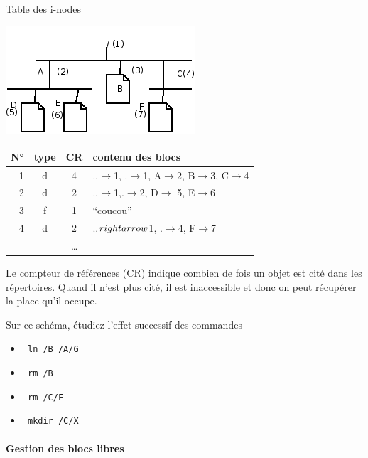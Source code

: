 \begin{multicols}{2}

Table des i-nodes

    \includegraphics[width=0.6\linewidth]{memoire-images/fichiers-unix.png}

\begin{tabular}{|rcc|l|}
\hline
N° & type & CR & contenu des blocs \\
\hline
1 & d & 4 & ..$\rightarrow$1, .$\rightarrow$1, A$\rightarrow$2, B$\rightarrow$3, C$\rightarrow$4 \\
2 & d & 2 & ..$\rightarrow$1,.$\rightarrow$2, D$\rightarrow$ 5, E$\rightarrow$6 \\
3 & f & 1 & ``coucou'' \\
4 & d & 2 & ..$\*rightarrow$1, .$\rightarrow$4, F$\rightarrow$7 \\
& & \ldots & \\
\hline
\end{tabular}

Le compteur de références (CR) indique combien de fois un objet est
cité dans les répertoires. Quand il n'est plus cité, il est inaccessible
et donc on peut récupérer la place qu'il occupe.

\begin{exercice}
Sur ce schéma, étudiez l'effet successif des commandes
\begin{itemize}

\item \texttt{ ln /B /A/G}
\item \texttt{ rm /B }
\item \texttt{ rm /C/F}
\item \texttt{ mkdir /C/X }
\end{itemize}
\end{exercice}

\paragraph{Gestion des blocs libres}


\end{multicols}
